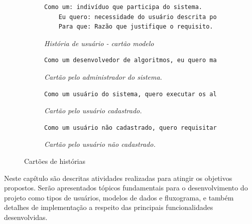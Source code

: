 \documentclass[tg]{mdtufsm}
\begin{document}
\begin{figure}
	\centering
	\begin{subfigure}[c]{1\textwidth}
		\begin{lstlisting}[frame=single, language=Python, numbers=none]
	Como um: indivíduo que participa do sistema.
	Eu quero: necessidade do usuário descrita por ele.
	Para que: Razão que justifique o requisito.
		\end{lstlisting}		
		\caption{\emph{História de usuário - cartão modelo}}
		\label{fig:userstory}
	\end{subfigure}
	\begin{subfigure}[c]{1\textwidth}
		\begin{lstlisting}[frame=single, language=Python, numbers=none]
	Como um desenvolvedor de algoritmos, eu quero manter uma plataforma para expor meus algoritmos para serem utilizados por outras pessoas.
		\end{lstlisting}
		
		\caption{\emph{Cartão pelo administrador do sistema.}}
		\label{fig:userstory2}
	\end{subfigure}
	\begin{subfigure}[c]{1\textwidth}
		\begin{lstlisting}[frame=single, language=Python, numbers=none]
	Como um usuário do sistema, quero executar os algoritmos oferecidos utilizando meu próprio conjunto de dados para entrada do algoritmos selecionado, e apurar o tempo de execução e o resultado da execução.
		\end{lstlisting}
		
		\caption{\emph{Cartão pelo usuário cadastrado.}}
		\label{fig:userstory3}
	\end{subfigure}
	\begin{subfigure}[c]{1\textwidth}
		\begin{lstlisting}[frame=single, language=Python, numbers=none]
	Como um usuário não cadastrado, quero requisitar acesso ao portal para poder executar meus experimentos.
	\end{lstlisting}
		
		\caption{\emph{Cartão pelo usuário não cadastrado.}}
		\label{fig:userstory4}
	\end{subfigure}
	\caption{Cartões de histórias}
\end{figure}

Neste capítulo são descritas atividades realizadas para atingir os objetivos propostos. Serão apresentados tópicos fundamentais para o desenvolvimento do projeto como tipos de usuários, modelos de dados e fluxograma, e também detalhes de implementação a respeito das principais funcionalidades desenvolvidas.
\end{document}
